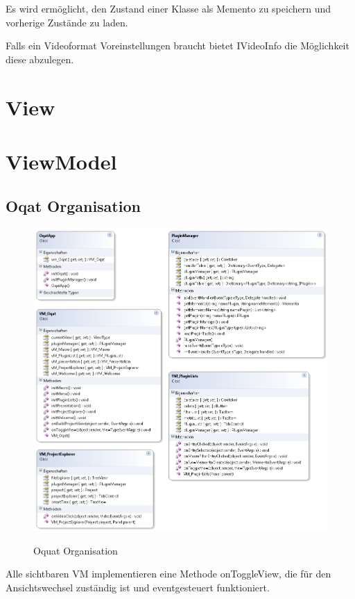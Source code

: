 Es wird ermöglicht, den Zustand einer Klasse als Memento zu speichern und vorherige Zustände zu laden.


Falls ein Videoformat Voreinstellungen braucht bietet IVideoInfo die Möglichkeit diese abzulegen.

\pagebreak
\section{View}



\pagebreak
\section{ViewModel}

\subsection{Oqat Organisation}
\begin{figure}[h]
\noindent\includegraphics[width=\linewidth,height=\textheight,
keepaspectratio]{bilder/Klassendiagramm/VM.png}
\label{}
\caption{Oquat Organisation}
\end{figure}

Alle sichtbaren VM implementieren eine Methode onToggleView, die für den Ansichtswechsel zuständig ist und eventgesteuert funktioniert.

